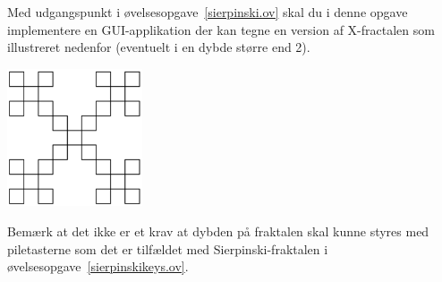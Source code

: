 Med udgangspunkt i øvelsesopgave~\ref{sierpinski.ov} skal du i denne opgave implementere en GUI-applikation der kan tegne en version af X-fractalen som illustreret nedenfor (eventuelt i en dybde større end 2).
\begin{center}
  \includegraphics[width=0.3\textwidth]{xfractal.png}
\end{center}
Bemærk at det ikke er et krav at dybden på fraktalen skal kunne styres med piletasterne som det er tilfældet med Sierpinski-fraktalen i øvelsesopgave~\ref{sierpinskikeys.ov}.

